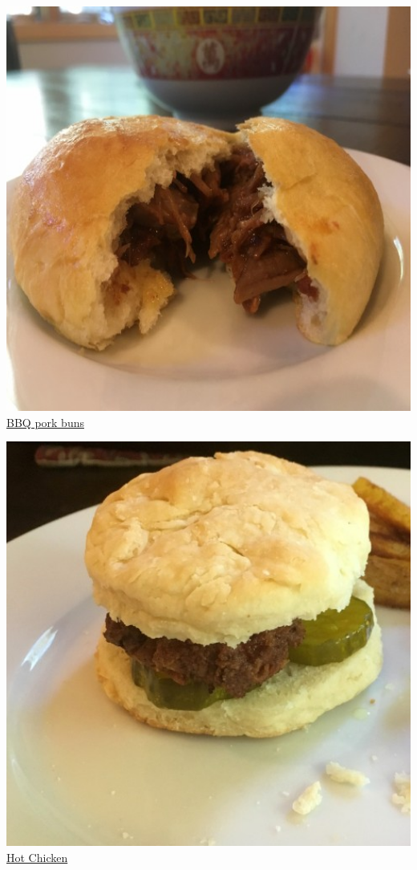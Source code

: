 \documentclass[
]{book}
\begin{document}
\protect\hyperlink{bbq}{\includegraphics[width=1\textwidth,height=\textheight]{bbq_pork_buns_small.jpg}}
\protect\hyperlink{bbq}{BBQ pork buns}

\protect\hyperlink{hotchicken}{\includegraphics[width=1\textwidth,height=\textheight]{hot_chicken_small.jpg}}
\protect\hyperlink{hotchicken}{Hot Chicken}
\end{document}
